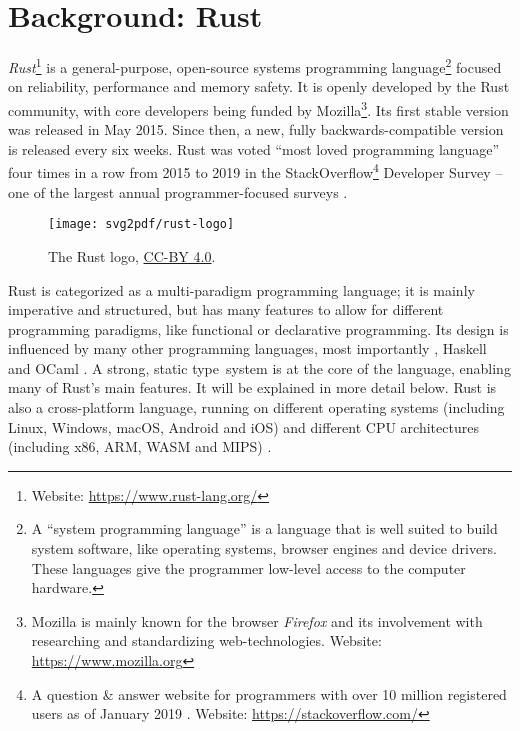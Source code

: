 \chapter{Background: Rust}

\emph{Rust}\footnote{Website: \url{https://www.rust-lang.org/}} is a general-purpose, open-source systems programming language\footnote{A \enquote{system programming language} is a language that is well suited to build system software, like operating systems, browser engines and device drivers. These languages give the programmer low-level access to the computer hardware.} focused on reliability, performance and memory safety.
It is openly developed by the Rust community, with core developers being funded by Mozilla\footnote{Mozilla is mainly known for the browser \emph{Firefox} and its involvement with researching and standardizing web-technologies. Website: \url{https://www.mozilla.org}}.
Its first stable version was released in May 2015.
Since then, a new, fully backwards-compatible version is released every six weeks.
Rust was voted \enquote{most loved programming language} four times in a row from 2015 to 2019 in the StackOverflow\footnote{A question \& answer website for programmers with over 10 million registered users as of January 2019 \cite{so-user-count}. Website: \url{https://stackoverflow.com/}} Developer Survey -- one of the largest annual programmer-focused surveys \cite{so-survey}.

\begin{figure}[h]
  \vspace{5mm}
  \centering
  \texttt{[image: svg2pdf/rust-logo]}
  \caption{The Rust logo, \protect\hyperlink{cc-by}{CC-BY 4.0}.}
  \vspace{5mm}
\end{figure}

Rust is categorized as a multi-paradigm programming language; it is mainly imperative and structured, but has many features to allow for different programming paradigms, like functional or declarative programming.
Its design is influenced by many other programming languages, most importantly \cpp, Haskell and OCaml \cite{rust-influences}.
A strong, static type~system is at the core of the language, enabling many of Rust's main features.
It will be explained in more detail below.
Rust is also a cross-platform language, running on different operating systems (including Linux, Windows, macOS, Android and iOS) and different CPU architectures (including x86, ARM, WASM and MIPS) \cite{rust-platforms}.

